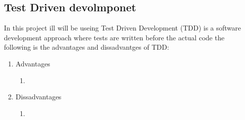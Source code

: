 	\subsection{Test Driven devolmponet}
	In this  project ill will be useing  Test Driven Development (TDD) is a software development approach where tests are written before the actual code
	the following is the advantages and dissadvantges of TDD:
	\begin{enumerate}
		\item Advantages
		\begin{enumerate}
			\item 
		\end{enumerate}
		\item Dissadvantages
		\begin{enumerate}
			\item 
		\end{enumerate}
	\end{enumerate}

